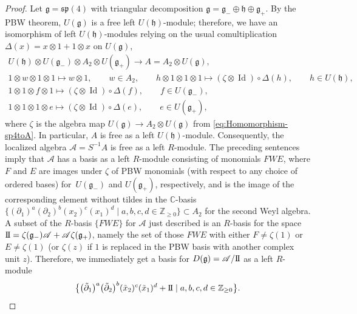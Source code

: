 \documentclass[pdftex]{sigma}
\numberwithin{equation}{section}
\DeclareMathOperator{\Id}{Id}
\newcommand{\II}{\mathrm{I\hspace{-.1em}I}}
\begin{document}
\begin{proof}
	Let $\mathfrak{g}=\mathfrak{sp}(4)$ with triangular decomposition $\mathfrak{g}=\mathfrak{g}_-\oplus\mathfrak{h}\oplus \mathfrak{g}_+$.
	By the PBW theorem, $U(\mathfrak{g})$ is a free left $U(\mathfrak{h})$-module;
	therefore,
	we have an isomorphism of left $U(\mathfrak{h})$-modules relying on the usual comultiplication $\Delta(x) = x \otimes 1 + 1\otimes x$ on $U(\mathfrak{g})$,
	\begin{gather*}
		U(\mathfrak{h})\otimes U(\mathfrak{g}_-)\otimes A_{2} \otimes U(\mathfrak{g}_+) \to A = A_2\otimes U(\mathfrak{g}), \\
		1\otimes w \otimes 1 \otimes 1 \mapsto w\otimes 1,\qquad w\in A_2,\qquad
		h\otimes 1\otimes 1\otimes 1 \mapsto (\zeta\otimes \Id)\circ\Delta(h),\qquad h\in U(\mathfrak{h}),\\
		1\otimes 1\otimes f\otimes 1 \mapsto (\zeta\otimes \Id)\circ\Delta(f),\qquad f\in U(\mathfrak{g}_-),\\
		1\otimes 1\otimes 1\otimes e \mapsto (\zeta\otimes \Id)\circ\Delta(e),\qquad e\in U(\mathfrak{g}_+),
	\end{gather*}
	where $\zeta$ is the algebra map $U(\mathfrak{g})\to A_2\otimes U(\mathfrak{g})$ from \eqref{eq:Homomorphism-sp4toA}.
	In particular, $A$ is free as a left $U(\mathfrak{h})$-module. Consequently, the localized algebra $\mathscr{A}=S^{-1}A$ is free as a left $R$-module.
	The preceding sentences imply that $\mathscr{A}$ has a basis as a left $R$-module consisting of monomials $FWE$,
	where $F$ and $E$ are images under $\zeta$ of PBW monomials (with respect to any choice of ordered bases) for~$U(\mathfrak{g}_-)$ and $U(\mathfrak{g}_+)$, respectively, and  is the image of the corresponding element without tildes in the $\mathbb{C}$-basis $\bigl\{(\partial_{1})^a(\partial_{2})^b (x_{2})^c(x_{1})^d
	\mid a,b,c,d \in \mathbb{Z}_{\geq 0} \bigr\} \subset A_{2}$ for the second Weyl algebra.
	A subset of the $R$-basis $\{FWE\}$ for $\mathscr{A}$ just described is an $R$-basis for the space $\II=\zeta(\mathfrak{g}_-)\mathscr{A}+\mathscr{A}\zeta(\mathfrak{g}_+)$, namely the set of those $FWE$ with either $F \neq \zeta(1)$ or~${E \neq \zeta(1)}$ (or $\zeta(z)$ if $1$ is replaced in the PBW basis with another complex unit $z$). Therefore, we immediately get a basis for $D(\mathfrak{g})=\mathscr{A}/\II$ as a left $R$-module
	\[%
		\bigl\{\bigl(\tilde{\partial}_{1}\bigr)^a\bigl(\tilde{\partial}_{2}\bigr)^b (\tilde{x}_{2})^c(\tilde{x}_{1})^d + \II\mid a,b,c,d\in\mathbb{Z}_{\geq 0}\bigr\}.
	\]
	

\end{proof}
\end{document}
